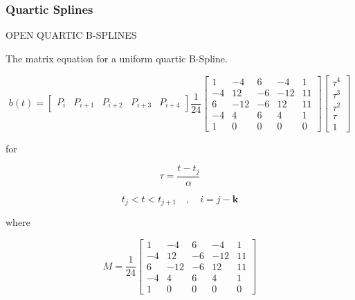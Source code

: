 \documentclass{article}
\begin{document}
    \subsubsection{Quartic Splines}
    
OPEN QUARTIC B-SPLINES
\hfill \break

    The matrix equation for a uniform quartic B-Spline.
    
    \begin{equation}
        b(t) = \begin{bmatrix} P_i & P_{i+1} & P_{i+2} & P_{i+3} & P_{i+4} \end{bmatrix} \frac{1}{24} \begin{bmatrix} 1 & -4  &  6 & -4  & 1 \\
                                                  -4 &  12 & -6 & -12 & 11\\
                                                   6 & -12 & -6 &  12 & 11\\
                                                  -4 &  4  &  6 &  4  & 1 \\
                                                   1 &  0  &  0 &  0  & 0\end{bmatrix} \begin{bmatrix} \tau^4 \\ \tau^3 \\ \tau^2 \\ \tau \\ 1 \end{bmatrix}
    \end{equation}
    
    for
    
    \begin{equation}
        \tau = \frac{t-t_j}{\alpha}
    \end{equation}
    
    \begin{equation}
        t_j < t < t_{j+1} \quad , \quad i = j-\textbf{k}
    \end{equation}
    
    where 
    
    \begin{equation}
    M = \frac{1}{24} \begin{bmatrix} 1 & -4  &  6 & -4  & 1 \\
                                    -4 &  12 & -6 & -12 & 11\\
                                     6 & -12 & -6 &  12 & 11\\
                                    -4 &  4  &  6 &  4  & 1 \\
                                     1 &  0  &  0 &  0  & 0 \end{bmatrix}
    \end{equation}
    
\end{document}
